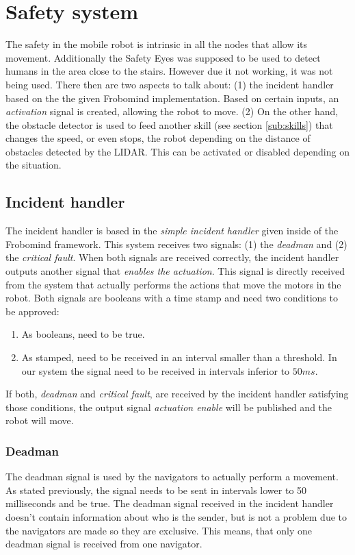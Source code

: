 \section{Safety system} %
\label{sec:mr_safety_system}
The safety in the mobile robot is intrinsic in all the nodes that allow its movement.
Additionally the Safety Eyes was supposed to be used to detect humans in the area close to the stairs. However due it not working, it was not being used.
There then are two aspects to talk about: (1) the incident handler based on the the given Frobomind implementation. Based on certain inputs, an \emph{activation} signal is created, allowing the robot to move.
(2) On the other hand, the obstacle detector is used to feed another skill (see section \ref{sub:skills}) that changes the speed, or even stops, the robot depending on the distance of obstacles detected by the LIDAR.
This can be activated or disabled depending on the situation.
	\subsection{Incident handler} %
	\label{sub:mr_incident_handler}
	The incident handler is based in the \emph{simple incident handler} given inside of the Frobomind framework.
	This system receives two signals: (1) the \emph{deadman} and (2) the \emph{critical fault}.
	When both signals are received correctly, the incident handler outputs another signal that \emph{enables the actuation}.
	This signal is directly received from the system that actually performs the actions that move the motors in the robot.
	Both signals are booleans with a time stamp and need two conditions to be approved:
	\begin{enumerate}
		\item As booleans, need to be true.
		\item As stamped, need to be received in an interval smaller than a threshold. In our system the signal need to be received in intervals inferior to $50 ms$.
	\end{enumerate}
	If both, \emph{deadman} and \emph{critical fault}, are received by the incident handler satisfying those conditions, the output signal \emph{actuation enable} will be published and the robot will move.
		\subsubsection{Deadman} %
		\label{ssub:mr_deadman}
		The deadman signal is used by the navigators to actually perform a movement.
		As stated previously, the signal needs to be sent in intervals lower to 50 milliseconds and be true.
		The deadman signal received in the incident handler doesn't contain information about who is the sender, but is not a problem due to the navigators are made so they are exclusive.
		This means, that only one deadman signal is received from one navigator.

